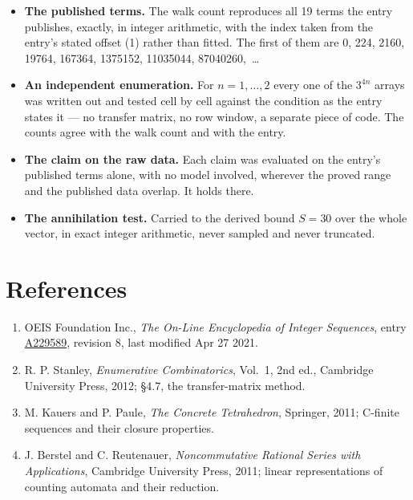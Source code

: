 \documentclass[11pt]{article}
\theoremstyle{definition}
\begin{document}
\begin{itemize}

\item {\bfseries The published terms.} The walk count reproduces all 19 terms the entry publishes, exactly, in integer arithmetic, with the index taken from the entry's stated offset (1) rather than fitted. The first of them are 0, 224, 2160, 19764, 167364, 1375152, 11035044, 87040260,~\dots

\item {\bfseries An independent enumeration.} For $n = 1,\dots,2$ every one of the $3^{4n}$ arrays was written out and tested cell by cell against the condition as the entry states it --- no transfer matrix, no row window, a separate piece of code. The counts agree with the walk count and with the entry.

\item {\bfseries The claim on the raw data.} Each claim was evaluated on the entry's published terms alone, with no model involved, wherever the proved range and the published data overlap. It holds there.

\item {\bfseries The annihilation test.} Carried to the derived bound $S = 30$ over the whole vector, in exact integer arithmetic, never sampled and never truncated.

\end{itemize}

\section{References}

\begin{enumerate}

\item OEIS Foundation Inc., \emph{The On-Line Encyclopedia of Integer Sequences}, entry \href{https://oeis.org/A229589}{A229589}, revision 8, last modified Apr 27 2021.

\item R. P. Stanley, \emph{Enumerative Combinatorics}, Vol.~1, 2nd ed., Cambridge University Press, 2012; \S4.7, the transfer-matrix method.

\item M. Kauers and P. Paule, \emph{The Concrete Tetrahedron}, Springer, 2011; C-finite sequences and their closure properties.

\item J. Berstel and C. Reutenauer, \emph{Noncommutative Rational Series with Applications}, Cambridge University Press, 2011; linear representations of counting automata and their reduction.

\end{enumerate}
\end{document}
